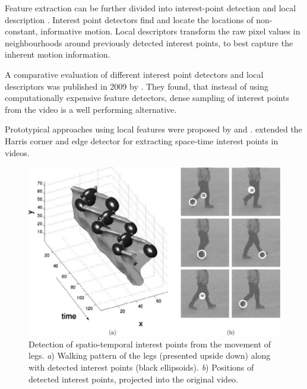 Feature extraction can be further divided into interest-point detection and local description \cite{poppe_survey_2010}.
Interest point detectors find and locate the locations of non-constant, informative motion.
Local descriptors transform the raw pixel values in neighbourhoods around previously detected interest points, to best capture the inherent motion information. 

A comparative evaluation of different interest point detectors and local descriptors was published in 2009 by \textcite{wang_evaluation_2009}.
They found, that instead of using computationally expensive feature detectors, dense sampling of interest points from the video is a well performing alternative. 

Prototypical approaches using local features were proposed by \textcite{laptev_space-time_2005} and \textcite{dollar_behavior_2005}.
\textcite{laptev_space-time_2005} extended the Harris corner and edge detector \cite{harris_combined_1988} for extracting space-time interest points in videos.

\begin{figure}[H]
    \centering
    \includegraphics[width=.8\textwidth]{img_conventional/laptev_stip}
\caption{Detection of spatio-temporal interest points from the movement of legs. \textit{a}) Walking pattern of the legs (presented upside down) along with detected interest points (black ellipsoids). \textit{b}) Positions of detected interest points, projected into the original video. \cite{laptev_space-time_2005}}
    \label{fig:laptev_stip}
\end{figure}

